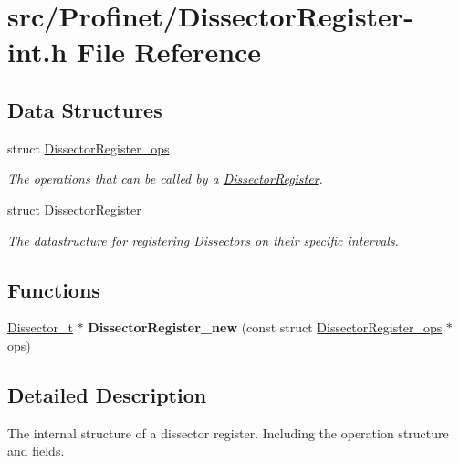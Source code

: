 \hypertarget{_dissector_register-int_8h}{\section{src/\-Profinet/\-Dissector\-Register-\/int.h File Reference}
\label{_dissector_register-int_8h}
}
\subsection*{Data Structures}
\begin{DoxyCompactItemize}
\item 
struct \hyperlink{struct_dissector_register__ops}{Dissector\-Register\-\_\-ops}
\begin{DoxyCompactList}\small\item\em The operations that can be called by a \hyperlink{struct_dissector_register}{Dissector\-Register}. \end{DoxyCompactList}\item 
struct \hyperlink{struct_dissector_register}{Dissector\-Register}
\begin{DoxyCompactList}\small\item\em The datastructure for registering Dissectors on their specific intervals. \end{DoxyCompactList}\end{DoxyCompactItemize}
\subsection*{Functions}
\begin{DoxyCompactItemize}
\item 
\hypertarget{_dissector_register-int_8h_a1fc9ce5db61206b38e9bfb2b6d7bebd0}{\hyperlink{struct_dissector}{Dissector\-\_\-t} $\ast$ {\bfseries Dissector\-Register\-\_\-new} (const struct \hyperlink{struct_dissector_register__ops}{Dissector\-Register\-\_\-ops} $\ast$ops)}\label{_dissector_register-int_8h_a1fc9ce5db61206b38e9bfb2b6d7bebd0}

\end{DoxyCompactItemize}


\subsection{Detailed Description}
The internal structure of a dissector register. Including the operation structure and fields. 